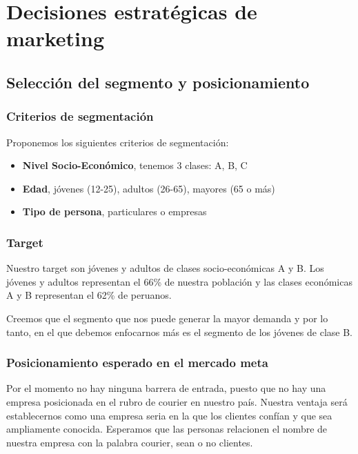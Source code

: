 \chapter{Decisiones estratégicas de marketing}

\section{Selección del segmento y posicionamiento}
\subsection{Criterios de segmentación}
Proponemos los siguientes criterios de segmentación:
\begin{itemize}
    \item \textbf{Nivel Socio-Económico}, tenemos 3 clases: A, B, C
    \item \textbf{Edad}, jóvenes (12-25), adultos (26-65), mayores (65 o más)
    \item \textbf{Tipo de persona}, particulares o empresas
\end{itemize}

\subsection{Target}
Nuestro target son jóvenes y adultos de clases socio-económicas A y B. Los jóvenes y adultos representan el 66\% de nuestra población y las clases económicas A y B representan el 62\% de peruanos.

Creemos que el segmento que nos puede generar la mayor demanda y por lo tanto, en el que debemos enfocarnos más es el segmento de los jóvenes de clase B.

\subsection{Posicionamiento esperado en el mercado meta}
Por el momento no hay ninguna barrera de entrada, puesto que no hay una empresa posicionada en el rubro de courier en nuestro país. Nuestra ventaja será establecernos como una empresa seria en la que los clientes confían y que sea ampliamente conocida. Esperamos que las personas relacionen el nombre de nuestra empresa con la palabra courier, sean o no clientes.
